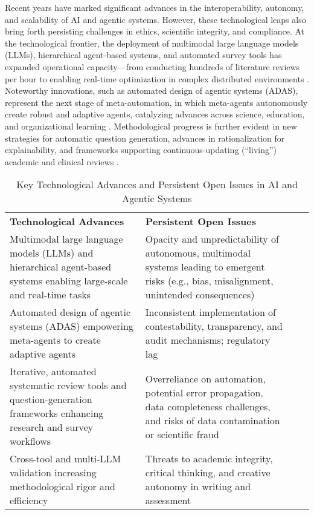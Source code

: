 \documentclass[sigconf]{acmart}
\begin{document}
Recent years have marked significant advances in the interoperability, autonomy, and scalability of AI and agentic systems. However, these technological leaps also bring forth persisting challenges in ethics, scientific integrity, and compliance. At the technological frontier, the deployment of multimodal large language models (LLMs), hierarchical agent-based systems, and automated survey tools has expanded operational capacity—from conducting hundreds of literature reviews per hour to enabling real-time optimization in complex distributed environments \cite{ref31,ref47,ref49,ref74,ref80,ref84,ref100,ref102,ref104}. Noteworthy innovations, such as automated design of agentic systems (ADAS), represent the next stage of meta-automation, in which meta-agents autonomously create robust and adaptive agents, catalyzing advances across science, education, and organizational learning \cite{ref31,ref34,ref35,ref47,ref49}. Methodological progress is further evident in new strategies for automatic question generation, advances in rationalization for explainability, and frameworks supporting continuous-updating (“living”) academic and clinical reviews \cite{ref74,ref84,ref100,ref102,ref104}.

\begin{table*}[htbp]
\centering
\caption{Key Technological Advances and Persistent Open Issues in AI and Agentic Systems}
\label{tab:advances_issues}
\begin{adjustbox}{max width=\textwidth}
\begin{tabular}{@{}llll@{}}
\toprule
\textbf{Technological Advances} & \textbf{Persistent Open Issues} &  &  \\
Multimodal large language models (LLMs) and hierarchical agent-based systems enabling large-scale and real-time tasks & Opacity and unpredictability of autonomous, multimodal systems leading to emergent risks (e.g., bias, misalignment, unintended consequences) &  &  \\
Automated design of agentic systems (ADAS) empowering meta-agents to create adaptive agents & Inconsistent implementation of contestability, transparency, and audit mechanisms; regulatory lag &  &  \\
Iterative, automated systematic review tools and question-generation frameworks enhancing research and survey workflows & Overreliance on automation, potential error propagation, data completeness challenges, and risks of data contamination or scientific fraud &  &  \\
Cross-tool and multi-LLM validation increasing methodological rigor and efficiency & Threats to academic integrity, critical thinking, and creative autonomy in writing and assessment &  &  \\
\bottomrule
\end{tabular}
\end{adjustbox}
\end{table*}
\end{document}
